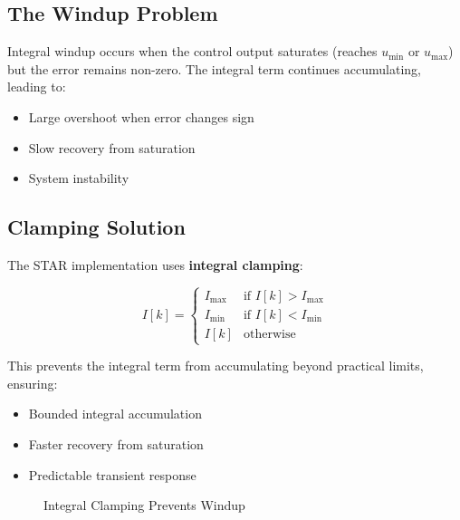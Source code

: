\documentclass[11pt,a4paper]{article}
\begin{document}
\subsection{The Windup Problem}

Integral windup occurs when the control output saturates (reaches $u_{\min}$ or $u_{\max}$) but the error remains non-zero. The integral term continues accumulating, leading to:
\begin{itemize}
  \item Large overshoot when error changes sign
  \item Slow recovery from saturation
  \item System instability
\end{itemize}

\subsection{Clamping Solution}

The STAR implementation uses \textbf{integral clamping}:

\begin{equation}
I[k] = \begin{cases}
I_{\max} & \text{if } I[k] > I_{\max} \\
I_{\min} & \text{if } I[k] < I_{\min} \\
I[k] & \text{otherwise}
\end{cases}
\end{equation}

This prevents the integral term from accumulating beyond practical limits, ensuring:
\begin{itemize}
  \item Bounded integral accumulation
  \item Faster recovery from saturation
  \item Predictable transient response
\end{itemize}

\begin{figure}[h]
\centering
{}
\caption{Integral Clamping Prevents Windup}
\end{figure}
\end{document}
